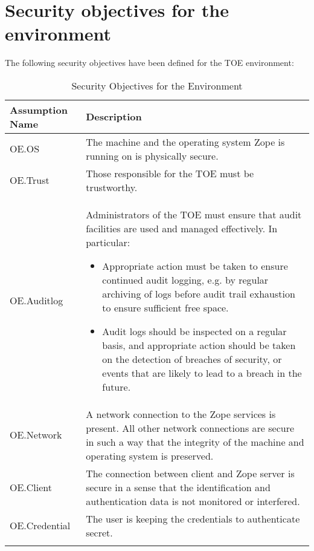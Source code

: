 \documentclass[12pt,english]{scrbook}
\begin{document}



\section{Security objectives for the environment}

The following security objectives have been defined for the TOE environment:

\begin{longtable}[c]{lp{10cm}}
  \toprule
  Assumption Name  &  Description \\
  \midrule\endhead

  OE.OS
   & 
  The machine and the operating system Zope is running
  on is physically secure.
   \\

  OE.Trust
   & 
  Those responsible for the TOE must be trustworthy.
   \\

  OE.Auditlog
   & 
  Administrators of the TOE must ensure that audit
  facilities are used and managed effectively. In
  particular:

  \begin{itemize}
  
    \item Appropriate action must be taken to ensure continued audit logging,
    e.g. by regular archiving of logs before audit trail exhaustion to ensure
    sufficient free space.

    \item Audit logs should be inspected on a regular basis, and appropriate
    action should be taken on the detection of breaches of security, or events
    that are likely to lead to a breach in the future.

  \end{itemize}
   \\

  OE.Network
   & 
  A network connection to the Zope services is present.
  All other network connections are secure in such a
  way that the integrity of the machine and operating
  system is preserved.
   \\

  OE.Client
   & 
  The connection between client and Zope server is secure
  in a sense that the identification and authentication
  data is not monitored or interfered.
   \\

  OE.Credential
   & 
  The user is keeping the credentials to authenticate
  secret.
  \\
  \bottomrule
  \caption{Security Objectives for the Environment}
\end{longtable}
\end{document}
